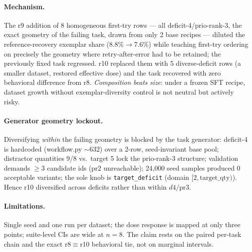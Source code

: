 \paragraph{Mechanism.}
The r9 addition of 8 homogeneous first-try rows --- all deficit-4/prio-rank-3, the
exact geometry of the failing task, drawn from only 2 base recipes --- diluted the
reference-recovery exemplar share (8.8\%$\to$7.6\%) while teaching first-try
ordering on precisely the geometry where retry-after-error had to be retained; the
previously fixed task regressed. r10 replaced them with 5 diverse-deficit rows (a
smaller dataset, restored effective dose) and the task recovered with zero
behavioral difference from r8. \emph{Composition beats size}: under a frozen SFT
recipe, dataset growth without exemplar-diversity control is not neutral but
actively risky.

\paragraph{Generator geometry lockout.}
Diversifying \emph{within} the failing geometry is blocked by the task generator:
deficit-4 is hardcoded (workflow.py $\sim$632) over a 2-row, seed-invariant base
pool; distractor quantities 9/8 vs.\ target 5 lock the prio-rank-3 structure;
validation demands $\geq 3$ candidate ids (pr2 unreachable); 24{,}000 seed samples
produced 0 acceptable variants; the sole knob is \texttt{target\_deficit}
(domain $[2, \text{target\_qty})$). Hence r10 diversified across deficits rather
than within $d4/\mathrm{pr}3$.

\paragraph{Limitations.}
Single seed and one run per dataset; the dose response is mapped at only three
points; suite-level CIs are wide at $n{=}8$. The claim rests on the paired
per-task chain and the exact r8$\equiv$r10 behavioral tie, not on marginal
intervals.
